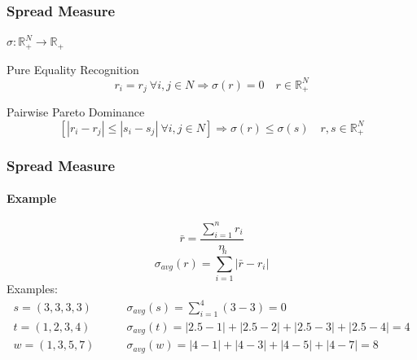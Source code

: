\documentclass{beamer}
\newcommand{\R}{\mathbb{R}}
\begin{document}
\begin{frame}
\frametitle{Spread Measure}
$\sigma : \R_{+}^{N}\longrightarrow \R_{+}$
\vspace{5mm}
 \begin{block}{Pure Equality Recognition}
	\[ r_i=r_j \ \forall i,j \in N \Rightarrow \sigma(r)=0 \quad r \in \R_{+}^{N}\]
\end{block}
 \begin{block}{Pairwise Pareto Dominance}
	\[\left[\left\vert r_{i}-r_{j}\right\vert \leq \left\vert s_{i}-s_{j}\right\vert \ \forall i, j\in N\right] \Rightarrow \sigma (r)\leq \sigma (s) \quad r,s\in \R_{+}^{N}\] 
\end{block}

\end{frame}

\begin{frame}
	\frametitle{Spread Measure}
	\framesubtitle{Example}
	\[\bar{r}=\frac{\sum_{i=1}^{n}r_i}{n}\]
	\[\sigma_{avg}(r)= \sum_{i=1}^{n}|\bar{r}-r_i| \]
	\onslide<2-> Examples:
	\begin{align*}
	s=(3,3,3,3) \qquad & \sigma_{avg}(s)= {\scriptstyle\sum_{i=1}^{4}(3-3)}=0 \\
	t=(1,2,3,4) \qquad & \sigma_{avg}(t)= {\scriptstyle |2.5-1|+|2.5-2|+|2.5-3|+|2.5-4|}=4 \\
	w=(1,3,5,7) \qquad & \sigma_{avg}(w)= 
	{\scriptstyle|4-1|+|4-3|+|4-5|+|4-7|}=8
	\end{align*}
\end{frame}
\end{document}
